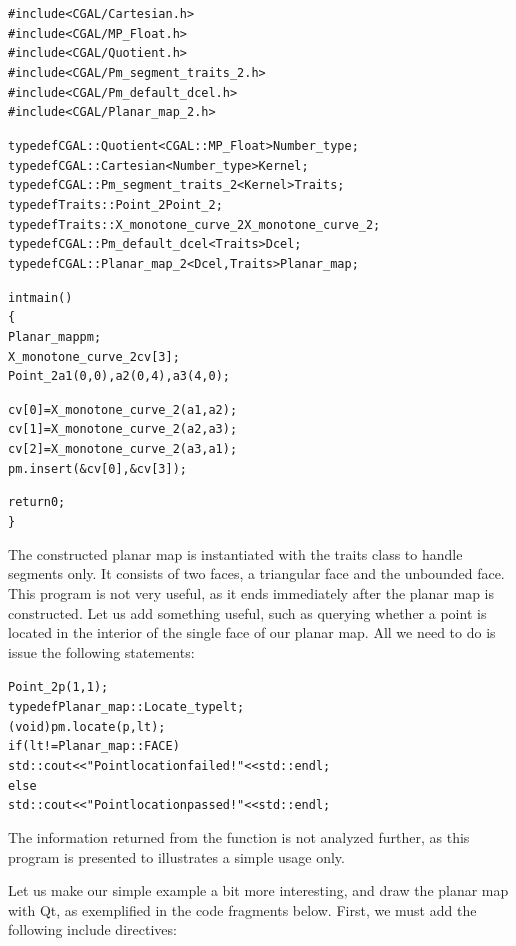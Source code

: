 \begin{alltt}
#include <CGAL/Cartesian.h>
#include <CGAL/MP_Float.h>
#include <CGAL/Quotient.h>
#include <CGAL/Pm_segment_traits_2.h>
#include <CGAL/Pm_default_dcel.h>
#include <CGAL/Planar_map_2.h>

typedef CGAL::Quotient<CGAL::MP_Float>    Number_type;
typedef CGAL::Cartesian<Number_type>      Kernel;
typedef CGAL::Pm_segment_traits_2<Kernel> Traits;
typedef Traits::Point_2                   Point_2;
typedef Traits::X_monotone_curve_2        X_monotone_curve_2;
typedef CGAL::Pm_default_dcel<Traits>     Dcel;
typedef CGAL::Planar_map_2<Dcel,Traits>   Planar_map;

int main()
\{
  Planar_map pm;
  X_monotone_curve_2 cv[3];
  Point_2 a1(0,0), a2(0,4), a3(4,0);
 
  cv[0] = X_monotone_curve_2(a1,a2);
  cv[1] = X_monotone_curve_2(a2,a3);
  cv[2] = X_monotone_curve_2(a3,a1);
  pm.insert(&cv[0], &cv[3]);

  return 0;
\}
\end{alltt}

The constructed planar map is instantiated with the
 traits class to handle segments only. It
consists of two faces, a triangular face and the unbounded face.
This program is not very useful, as it ends immediately after the
planar map is constructed. Let us add something useful, such as
querying whether a point is located in the interior of the single
face of our planar map. All we need to do is issue the following
statements:

\begin{alltt}
  Point_2 p(1,1);
  typedef Planar_map::Locate_type lt;
  (void) pm.locate(p, lt);
  if (lt != Planar_map::FACE)
    std::cout << "Point location failed!" << std::endl;
  else
    std::cout << "Point location passed!" << std::endl;
\end{alltt}

The information returned from the  function is
not analyzed further, as this program is presented to illustrates a
simple usage only.

Let us make our simple example a bit more interesting, and draw
the planar map with Qt, as exemplified in the code fragments below.
First, we must add the following include directives:

\\
\\

